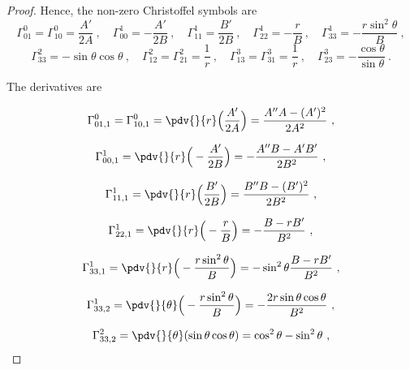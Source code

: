 \begin{proof}
        Hence, the non-zero Christoffel symbols are 
        \begin{equation*}
            \Gamma^0_{01} = \Gamma^0_{10} = \frac{A'}{2A} ~, \quad \Gamma^1_{00} = - \frac{A'}{2B} ~, \quad \Gamma^1_{11} = \frac{B'}{2B} ~, \quad \Gamma^1_{22} = - \frac{r}{B} ~, \quad \Gamma^1_{33} = - \frac{r \sin^2 \theta}{B} ~,
        \end{equation*}
        \begin{equation*}
            \Gamma^2_{33} = - \sin\theta \cos\theta ~, \quad \Gamma^2_{12} =  \Gamma^2_{21} = \frac{1}{r} ~, \quad \Gamma^3_{13} = \Gamma^3_{31} = \frac{1}{r} ~, \quad \Gamma^3_{23} = -\frac{\cos \theta}{\sin \theta} ~. 
        \end{equation*}

        The derivatives are 

        \begin{equation*}
            \Gamma^0_{01,1} = \Gamma^0_{10,1} = \pdv{}{r} \Big (\frac{A'}{2A} \Big) = \frac{A''A - (A')^2}{2A^2} ~,
        \end{equation*}

        \begin{equation*}
            \Gamma^1_{00,1} = \pdv{}{r} \Big ( - \frac{A'}{2B} \Big) = - \frac{A'' B - A' B'}{2B^2} ~,
        \end{equation*}

        \begin{equation*}
            \Gamma^1_{11,1} = \pdv{}{r} \Big (\frac{B'}{2B} \Big) = \frac{B''B - (B')^2}{2B^2} ~,
        \end{equation*}

        \begin{equation*}
            \Gamma^1_{22,1} = \pdv{}{r} \Big (- \frac{r}{B} \Big) = -\frac{B - r B'}{B^2} ~,
        \end{equation*}

        \begin{equation*}
            \Gamma^1_{33,1} = \pdv{}{r} \Big ( - \frac{r \sin^2 \theta}{B} \Big) = - \sin^2 \theta \frac{B - rB'}{B^2} ~,
        \end{equation*}

        \begin{equation*}
            \Gamma^1_{33,2} = \pdv{}{\theta} \Big ( - \frac{r \sin^2 \theta}{B} \Big) = - \frac{2 r \sin \theta \cos \theta}{B^2} ~,
        \end{equation*}

        \begin{equation*}
            \Gamma^2_{33,2} = \pdv{}{\theta} ( \sin \theta \cos \theta ) = \cos^2 \theta - \sin^2 \theta ~,
        \end{equation*}


\end{proof}
